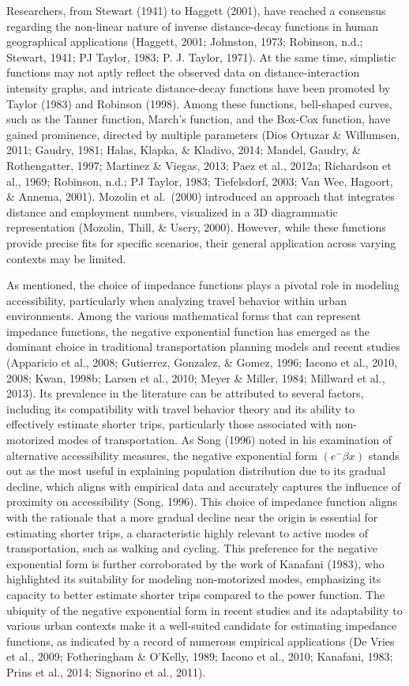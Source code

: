 \documentclass[
11pt, %
oneside, %
english, %
singlespacing, %
]{macthesis} %
\begin{document}
Researchers, from Stewart (1941) to Haggett (2001), have reached a consensus regarding the non-linear nature of inverse distance-decay functions in human geographical applications (Haggett, 2001; Johnston, 1973; Robinson, n.d.; Stewart, 1941; PJ Taylor, 1983; P. J. Taylor, 1971). At the same time, simplistic functions may not aptly reflect the observed data on distance-interaction intensity graphs, and intricate distance-decay functions have been promoted by Taylor (1983) and Robinson (1998). Among these functions, bell-shaped curves, such as the Tanner function, March's function, and the Box-Cox function, have gained prominence, directed by multiple parameters (Dios Ortuzar \& Willumsen, 2011; Gaudry, 1981; Halas, Klapka, \& Kladivo, 2014; Mandel, Gaudry, \& Rothengatter, 1997; Martinez \& Viegas, 2013; Paez et al., 2012a; Richardson et al., 1969; Robinson, n.d.; PJ Taylor, 1983; Tiefelsdorf, 2003; Van Wee, Hagoort, \& Annema, 2001). Mozolin et al.~(2000) introduced an approach that integrates distance and employment numbers, visualized in a 3D diagrammatic representation (Mozolin, Thill, \& Usery, 2000). However, while these functions provide precise fits for specific scenarios, their general application across varying contexts may be limited.

As mentioned, the choice of impedance functions plays a pivotal role in modeling accessibility, particularly when analyzing travel behavior within urban environments. Among the various mathematical forms that can represent impedance functions, the negative exponential function has emerged as the dominant choice in traditional transportation planning models and recent studies (Apparicio et al., 2008; Gutierrez, Gonzalez, \& Gomez, 1996; Iacono et al., 2010, 2008; Kwan, 1998b; Larsen et al., 2010; Meyer \& Miller, 1984; Millward et al., 2013). Its prevalence in the literature can be attributed to several factors, including its compatibility with travel behavior theory and its ability to effectively estimate shorter trips, particularly those associated with non-motorized modes of transportation. As Song (1996) noted in his examination of alternative accessibility measures, the negative exponential form \((e ^-\beta x)\) stands out as the most useful in explaining population distribution due to its gradual decline, which aligns with empirical data and accurately captures the influence of proximity on accessibility (Song, 1996). This choice of impedance function aligns with the rationale that a more gradual decline near the origin is essential for estimating shorter trips, a characteristic highly relevant to active modes of transportation, such as walking and cycling. This preference for the negative exponential form is further corroborated by the work of Kanafani (1983), who highlighted its suitability for modeling non-motorized modes, emphasizing its capacity to better estimate shorter trips compared to the power function. The ubiquity of the negative exponential form in recent studies and its adaptability to various urban contexts make it a well-suited candidate for estimating impedance functions, as indicated by a record of numerous empirical applications (De Vries et al., 2009; Fotheringham \& O'Kelly, 1989; Iacono et al., 2010; Kanafani, 1983; Prins et al., 2014; Signorino et al., 2011).
\end{document}

